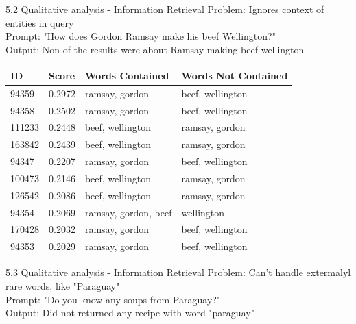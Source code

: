 \documentclass{beamer}
\begin{document}
\begin{frame} {5.2 Qualitative analysis - Information Retrieval}
  Problem: Ignores context of entities in query\\
  Prompt: "How does Gordon Ramsay make his beef Wellington?"\\
  Output: Non of the results were about Ramsay making beef wellington
  \begin{table}[]
    \centering
    \begin{tabular}{|l|l|l|l|}
      \hline
      \textbf{ID} & \textbf{Score} & \textbf{Words Contained} & \textbf{Words Not Contained} \\ \hline
      94359       & 0.2972         & ramsay, gordon           & beef, wellington             \\ \hline
      94358       & 0.2502         & ramsay, gordon           & beef, wellington             \\ \hline
      111233      & 0.2448         & beef, wellington         & ramsay, gordon               \\ \hline
      163842      & 0.2439         & beef, wellington         & ramsay, gordon               \\ \hline
      94347       & 0.2207         & ramsay, gordon           & beef, wellington             \\ \hline
      100473      & 0.2146         & beef, wellington         & ramsay, gordon               \\ \hline
      126542      & 0.2086         & beef, wellington         & ramsay, gordon               \\ \hline
      94354       & 0.2069         & ramsay, gordon, beef     & wellington                   \\ \hline
      170428      & 0.2032         & ramsay, gordon           & beef, wellington             \\ \hline
      94353       & 0.2029         & ramsay, gordon           & beef, wellington             \\ \hline
    \end{tabular}
  \end{table}
\end{frame}

\begin{frame} {5.3 Qualitative analysis - Information Retrieval}
  Problem: Can't handle extermalyl rare words, like "Paraguay"\\
  Prompt: "Do you know any soups from Paraguay?"\\
  Output: Did not returned any recipe with word "paraguay"
\end{frame}
\end{document}
